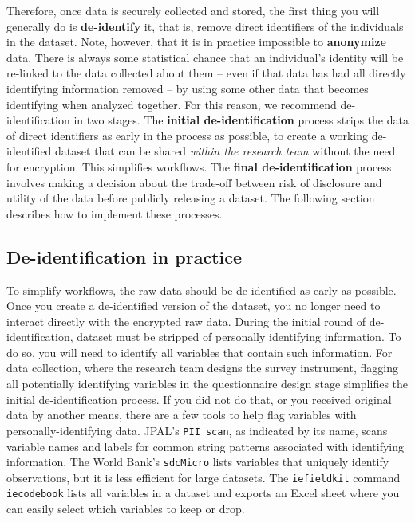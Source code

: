 Therefore, once data is securely collected and stored,
the first thing you will generally do is \textbf{de-identify} it,
that is, remove direct identifiers of the individuals in the dataset.
Note, however, that it is in practice impossible to \textbf{anonymize} data.
There is always some statistical chance that an individual's identity
will be re-linked to the data collected about them
-- even if that data has had all directly identifying information removed --
by using some other data that becomes identifying when analyzed together.
For this reason, we recommend de-identification in two stages.
The \textbf{initial de-identification} process strips the data of direct identifiers
as early in the process as possible,
to create a working de-identified dataset that
can be shared \textit{within the research team} without the need for encryption.
This simplifies workflows.
The \textbf{final de-identification} process involves
making a decision about the trade-off between
risk of disclosure and utility of the data
before publicly releasing a dataset.
The following section describes how to implement these processes.


\subsection{De-identification in practice}

To simplify workflows, the raw data should be de-identified as early as possible.
Once you create a de-identified version of the dataset,
you no longer need to interact directly with the encrypted raw data.
During the initial round of de-identification, 
dataset must be stripped of personally identifying information.
To do so, you will need to identify all variables that contain
such information.
For data collection, where the research team designs the survey instrument,
flagging all potentially identifying variables in the questionnaire design stage
simplifies the initial de-identification process.
If you did not do that, or you received original data by another means,
there are a few tools to help flag variables with personally-identifying data.
JPAL's \texttt{PII scan}, as indicated by its name,
scans variable names and labels for common string patterns associated with identifying information.
The World Bank's \texttt{sdcMicro}
lists variables that uniquely identify observations, 
but it is less efficient for large datasets.
The \texttt{iefieldkit} command \texttt{iecodebook}
lists all variables in a dataset and exports an Excel sheet
where you can easily select which variables to keep or drop.

